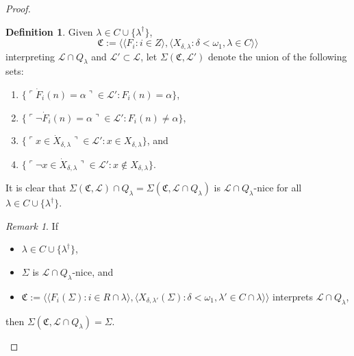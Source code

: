 \documentclass[12pt, twoside]{memoir}
\numberwithin{equation}{section}
\theoremstyle{definition}
\newtheorem{defi}[thm]{Definition}
\theoremstyle{remark}
\newtheorem{rem}[thm]{Remark}
\theoremstyle{definition}
\theoremstyle{definition}
\theoremstyle{definition}
\theoremstyle{remark}
\begin{document}
\begin{proof}
\begin{defi}\label{def415}
Given $\lambda \in C \cup \{\lambda^{\dagger}\}$, $$\mathfrak{C} := \langle \langle F_i : i \in Z \rangle, \langle X_{\delta, \lambda} : \delta < \omega_1, \lambda \in C \rangle \rangle$$
interpreting $\mathcal{L} \cap Q_{\lambda}$ and $\mathcal{L}' \subset \mathcal{L}$, let $\Sigma(\mathfrak{C}, \mathcal{L}')$ denote the union of the following sets:
\begin{enumerate}[label=(\alph*)]
    \item $\{\ulcorner \dot{F}_i (n) = \alpha \urcorner \in \mathcal{L}' : F_i (n) = \alpha\}$,
    \item $\{\ulcorner \neg \dot{F}_i (n) = \alpha \urcorner \in \mathcal{L}' : F_i (n) \neq \alpha\}$,
    \item $\{\ulcorner x \in \dot{X}_{\delta, \lambda} \urcorner \in \mathcal{L}' : x \in X_{\delta, \lambda}\}$, and
    \item $\{\ulcorner \neg x \in \dot{X}_{\delta, \lambda} \urcorner \in \mathcal{L}' : x \not\in X_{\delta, \lambda}\}$.
\end{enumerate}
It is clear that $\Sigma(\mathfrak{C}, \mathcal{L}) \cap Q_{\lambda} = \Sigma(\mathfrak{C}, \mathcal{L} \cap Q_{\lambda})$ is $\mathcal{L} \cap Q_{\lambda}$-nice for all $\lambda \in C \cup \{\lambda^{\dagger}\}$.
\end{defi}

\begin{rem}\label{rem416}
If 
\begin{itemize}
    \item $\lambda \in C \cup \{\lambda^{\dagger}\}$, 
    \item $\Sigma$ is $\mathcal{L} \cap Q_{\lambda}$-nice, and
    \item $\mathfrak{C} := \langle \langle F_i(\Sigma) : i \in R \cap \lambda \rangle, \langle X_{\delta, \lambda'}(\Sigma) : \delta < \omega_1, \lambda' \in C \cap \lambda \rangle \rangle$ interprets $\mathcal{L} \cap Q_{\lambda}$,
\end{itemize}
then $\Sigma(\mathfrak{C}, \mathcal{L} \cap Q_{\lambda}) = \Sigma$.
\end{rem}


\end{proof}
\end{document}
